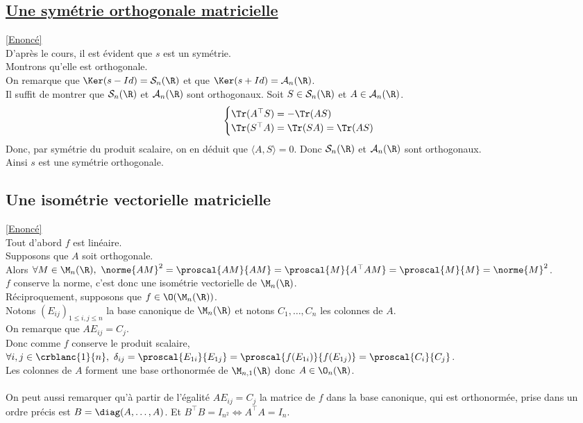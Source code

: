 \documentclass[8pt]{book}
\begin{document}
	\subsection{\underline{Une symétrie orthogonale matricielle} }
	\label{Une symétrie orthogonale matricielle corrigé}
	\textcolor{blue}{\hyperref[Une symétrie orthogonale matricielle]{[Enoncé]}}\\
	D'après le cours, il est évident que $s$ est un symétrie.\\
	Montrons qu'elle est orthogonale.\\
	On remarque que $\Ker(s-Id)=\mathcal{S}_n(\R)$ et que $\Ker(s+Id)=\mathcal{A}_n(\R)$.\\
	Il suffit de montrer que $\mathcal{S}_n(\R)$ et $\mathcal{A}_n(\R)$ sont orthogonaux.
	Soit $S\in\mathcal{S}_n(\R)$ et $A\in\mathcal{A}_n(\R)$.\\
	\[\begin{cases}
		\Tr(A^\top S)=-\Tr(AS)\\
		\Tr(S^\top A)=\Tr(SA)=\Tr(AS)
	\end{cases}\]
	Donc, par symétrie du produit scalaire, on en déduit que $\langle A, S\rangle =0$.
	Donc $\mathcal{S}_n(\R)$ et $\mathcal{A}_n(\R)$ sont orthogonaux.\\
	Ainsi $s$ est une symétrie orthogonale.
	
	\subsection{Une isométrie vectorielle matricielle}
	\label{Une isométrie vectorielle matricielle corrigé}
	\textcolor{blue}{\hyperref[Une isométrie vectorielle matricielle]{[Enoncé]}}\\
	Tout d'abord $f$ est linéaire.\\
	Supposons que $A$ soit orthogonale.\\
	Alors $\forall M\in \M_n(\R),\ \norme{AM}^2=\proscal{AM}{AM}=\proscal{M}{A^\top AM}=\proscal{M}{M}=\norme{M}^2$.\\
	$f$ conserve la norme, c'est donc une isométrie vectorielle de $\M_n(\R)$.\\
	Réciproquement, supposons que $f\in \O(\M_n(\R))$.\\
	Notons $(E_{ij})_{1\leq i,j\leq n}$ la base canonique de $\M_n(\R)$ et notons $C_1,\dots,C_n$ les colonnes de $A$.\\
	On remarque que $AE_{ij}=C_j$.\\
	Donc comme $f$ conserve le produit scalaire, $\forall i,j\in \crblanc{1}{n},\ \delta_{ij}=\proscal{E_{1i}}{E_{1j}}=\proscal{f(E_{1i})}{f(E_{1j})}=\proscal{C_i}{C_j}$.\\
	Les colonnes de $A$ forment une base orthonormée de $\M_{n,1}(\R)$ donc $A\in \O_n(\R)$.\\\\
	On peut aussi remarquer qu'à partir de l'égalité $AE_{ij}=C_j$ la matrice de $f$ dans la base canonique, qui est orthonormée, prise dans un ordre précis est $B=\diag(A,\dots,A)$. Et $B^\top B=I_{n^2}\iff A^\top A=I_n$.
	
\end{document}

